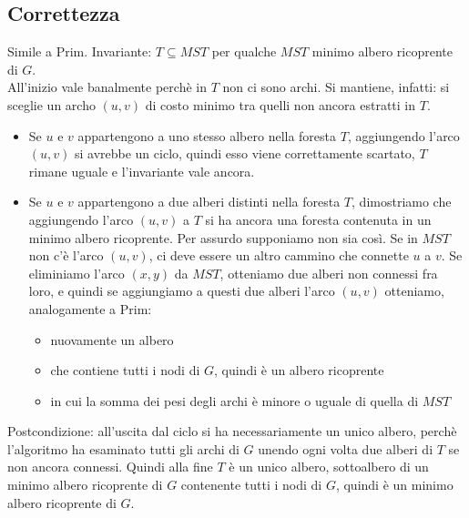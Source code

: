 \documentclass[12pt]{article}
\begin{document}
\subsection{Correttezza}
Simile a Prim. Invariante: $T \subseteq MST$ per qualche $MST$ minimo albero ricoprente di $G$.\\
All'inizio vale banalmente perchè in $T$ non ci sono archi. Si mantiene, infatti: si sceglie un archo $(u,v)$ di costo minimo tra quelli non ancora estratti in $T$.
\begin{itemize}
    \item Se $u$ e $v$ appartengono a uno stesso albero nella foresta $T$, aggiungendo l'arco $(u,v)$ si avrebbe un ciclo, quindi esso viene correttamente scartato, $T$ rimane uguale e l'invariante vale ancora.
    \item Se $u$ e $v$ appartengono a due alberi distinti nella foresta $T$, dimostriamo che aggiungendo l'arco $(u,v)$ a $T$ si ha ancora una foresta contenuta in un minimo albero ricoprente. Per assurdo supponiamo non sia così. Se in $MST$ non c'è l'arco $(u,v)$, ci deve essere un altro cammino che connette $u$ a $v$. Se eliminiamo l'arco $(x,y)$ da $MST$, otteniamo due alberi non connessi fra loro, e quindi se aggiungiamo a questi due alberi l'arco $(u,v)$ otteniamo, analogamente a Prim: \begin{itemize}
        \item nuovamente un albero
        \item che contiene tutti i nodi di $G$, quindi è un albero ricoprente
        \item in cui la somma dei pesi degli archi è minore o uguale di quella di $MST$
    \end{itemize}
\end{itemize}
Postcondizione: all'uscita dal ciclo si ha necessariamente un unico albero, perchè l'algoritmo ha esaminato tutti gli archi di $G$ unendo ogni volta due alberi di $T$ se non ancora connessi. Quindi alla fine $T$ è un unico albero, sottoalbero di un minimo albero ricoprente di $G$ contenente tutti i nodi di $G$, quindi è un minimo albero ricoprente di $G$.
\end{document}
